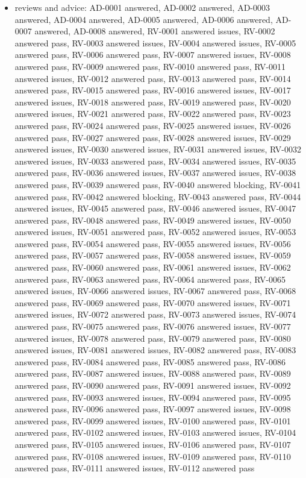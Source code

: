 \documentclass[11pt]{article}
\begin{document}
\begin{itemize}
\item reviews and advice: AD-0001 answered, AD-0002 answered, AD-0003 answered, AD-0004 answered, AD-0005 answered, AD-0006 answered, AD-0007 answered, AD-0008 answered, RV-0001 answered issues, RV-0002 answered pass, RV-0003 answered issues, RV-0004 answered issues, RV-0005 answered pass, RV-0006 answered pass, RV-0007 answered issues, RV-0008 answered pass, RV-0009 answered pass, RV-0010 answered pass, RV-0011 answered issues, RV-0012 answered pass, RV-0013 answered pass, RV-0014 answered pass, RV-0015 answered pass, RV-0016 answered issues, RV-0017 answered issues, RV-0018 answered pass, RV-0019 answered pass, RV-0020 answered issues, RV-0021 answered pass, RV-0022 answered pass, RV-0023 answered pass, RV-0024 answered pass, RV-0025 answered issues, RV-0026 answered pass, RV-0027 answered pass, RV-0028 answered issues, RV-0029 answered issues, RV-0030 answered issues, RV-0031 answered issues, RV-0032 answered issues, RV-0033 answered pass, RV-0034 answered issues, RV-0035 answered pass, RV-0036 answered issues, RV-0037 answered issues, RV-0038 answered pass, RV-0039 answered pass, RV-0040 answered blocking, RV-0041 answered pass, RV-0042 answered blocking, RV-0043 answered pass, RV-0044 answered issues, RV-0045 answered pass, RV-0046 answered issues, RV-0047 answered pass, RV-0048 answered pass, RV-0049 answered issues, RV-0050 answered issues, RV-0051 answered pass, RV-0052 answered issues, RV-0053 answered pass, RV-0054 answered pass, RV-0055 answered issues, RV-0056 answered pass, RV-0057 answered pass, RV-0058 answered issues, RV-0059 answered pass, RV-0060 answered pass, RV-0061 answered issues, RV-0062 answered pass, RV-0063 answered pass, RV-0064 answered pass, RV-0065 answered issues, RV-0066 answered issues, RV-0067 answered pass, RV-0068 answered pass, RV-0069 answered pass, RV-0070 answered issues, RV-0071 answered issues, RV-0072 answered pass, RV-0073 answered issues, RV-0074 answered pass, RV-0075 answered pass, RV-0076 answered issues, RV-0077 answered issues, RV-0078 answered pass, RV-0079 answered pass, RV-0080 answered issues, RV-0081 answered issues, RV-0082 answered pass, RV-0083 answered pass, RV-0084 answered pass, RV-0085 answered pass, RV-0086 answered pass, RV-0087 answered issues, RV-0088 answered pass, RV-0089 answered pass, RV-0090 answered pass, RV-0091 answered issues, RV-0092 answered pass, RV-0093 answered issues, RV-0094 answered pass, RV-0095 answered pass, RV-0096 answered pass, RV-0097 answered issues, RV-0098 answered pass, RV-0099 answered issues, RV-0100 answered pass, RV-0101 answered pass, RV-0102 answered issues, RV-0103 answered issues, RV-0104 answered pass, RV-0105 answered issues, RV-0106 answered pass, RV-0107 answered pass, RV-0108 answered issues, RV-0109 answered pass, RV-0110 answered pass, RV-0111 answered issues, RV-0112 answered pass

\end{itemize}
\end{document}
